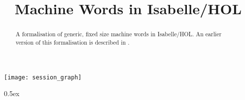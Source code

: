 \documentclass[11pt,a4paper]{article}
\begin{document}
\title{Machine Words in Isabelle/HOL}

\maketitle

\begin{abstract}
A formalisation of generic, fixed size machine words in Isabelle/HOL. An earlier version of this 
formalisation is described in \cite{dawson-avocs07}.  
\end{abstract}

\tableofcontents

\begin{center}
  \texttt{[image: session\_graph]}
\end{center}

\newpage

\renewcommand{\isamarkupheader}[1]%
{\section{\isabellecontext: #1}\markright{THEORY~``\isabellecontext''}}

\parindent 0pt\parskip 0.5ex




\end{document}
